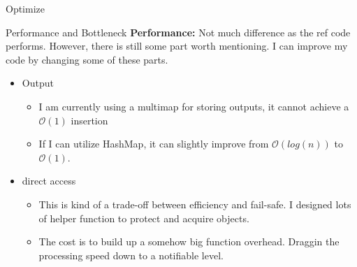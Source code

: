 \documentclass[12pt,a4paper]{report}
\begin{document}
\begin{section}{Optimize}
\begin{subsection}{Performance and Bottleneck}
  \textbf{Performance: } Not much difference as the ref code performs. However, there is still some part
  worth mentioning. I can improve my code by changing some of these parts.
  \begin{itemize}
    \item Output
    \begin{itemize}
      \item I am currently using a multimap for storing outputs, it cannot achieve a $\mathcal{O}(1)$ insertion
      \item If I can utilize HashMap, it can slightly improve from $\mathcal{O}(log(n))$ to $\mathcal{O}(1)$.
    \end{itemize}
    \item direct access
    \begin{itemize}
      \item This is kind of a trade-off between efficiency and fail-safe. I designed lots of helper function
            to protect and acquire objects.
      \item The cost is to build up a somehow big function overhead. Draggin the processing speed down to
      a notifiable level.
    \end{itemize}
  \end{itemize}
\end{subsection}
\end{section}
\end{document}
